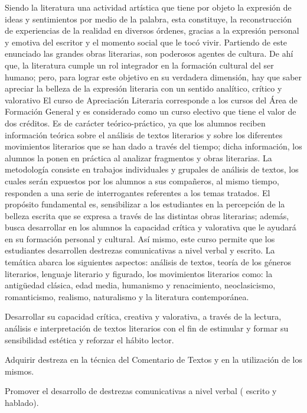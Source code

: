\begin{syllabus}


\begin{justification}
Siendo la literatura una actividad artística que tiene por objeto la expresión de ideas y sentimientos por medio de la palabra, esta constituye, la reconstrucción de experiencias de la realidad en diversos órdenes, gracias a la expresión personal y emotiva del escritor y el momento social que le tocó vivir.
Partiendo de este enunciado las grandes obras literarias, son poderosos agentes de cultura. De ahí que, la literatura cumple un rol integrador en la formación cultural del ser humano; pero,  para lograr este objetivo en su verdadera dimensión, hay que saber apreciar la belleza de la expresión literaria con un sentido analítico, crítico y valorativo
El curso de Apreciación Literaria corresponde a los cursos del Área de Formación General y es considerado como un curso electivo que tiene el valor de dos créditos. Es de carácter teórico-práctico, ya que los alumnos reciben información teórica sobre el análisis de textos literarios y sobre los diferentes movimientos literarios que se han dado a través del tiempo; dicha información, los alumnos la ponen en práctica al analizar fragmentos y obras literarias. La metodología consiste en trabajos individuales y grupales de análisis de textos, los cuales serán expuestos por los alumnos a sus compañeros, al mismo tiempo, responden a una serie de interrogantes referentes a los temas tratados. El propósito fundamental es, sensibilizar a los estudiantes en la percepción de la belleza escrita que se expresa a través de las distintas obras literarias; además, busca desarrollar en los alumnos la capacidad crítica y valorativa que le ayudará en su formación personal y cultural. Así­ mismo, este curso permite que los estudiantes desarrollen destrezas comunicativas a nivel verbal y escrito.
La temática abarca los siguientes aspectos: análisis de textos, teoría de los géneros literarios, lenguaje literario y figurado, los movimientos literarios como: la antigüedad clásica, edad media, humanismo y renacimiento, neoclasicismo, romanticismo, realismo, naturalismo y la literatura contemporánea.
\end{justification}

\begin{goals}
\item Desarrollar su capacidad crítica, creativa y valorativa, a través de la lectura, análisis e interpretación de textos literarios con el fin de estimular y formar su sensibilidad estética y reforzar el hábito lector.
\item Adquirir destreza en la técnica del Comentario de Textos y en la utilización de los mismos.
\item Promover el desarrollo de destrezas comunicativas a nivel verbal ( escrito y hablado).
\end{goals}


\end{syllabus}
